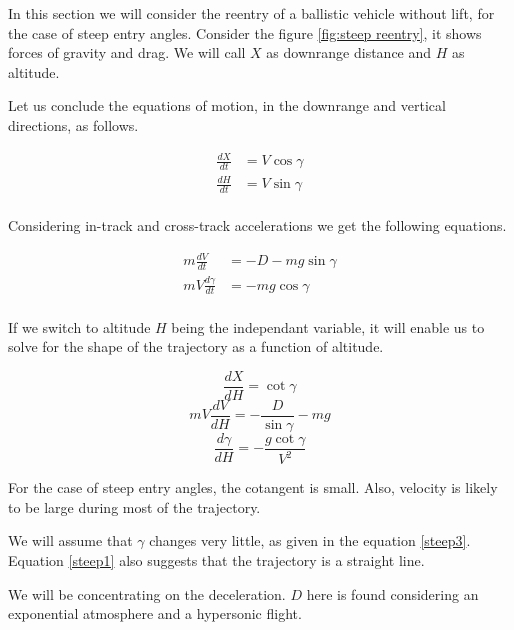 \documentclass{article}
\theoremstyle{definition}
\begin{document}
In this section we will consider the reentry of a ballistic vehicle without lift, for the case of steep entry angles.
Consider the figure \ref{fig:steep reentry}, it shows forces of gravity and drag.
We will call $X$ as downrange distance and $H$ as altitude. 

Let us conclude the equations of motion, in the downrange and vertical directions, as follows.

\begin{equation}
\begin{split}
    \frac{dX}{dt} & = V \cos{\gamma}\\
    \frac{dH}{dt} & = V \sin{\gamma}\\
\end{split}
\end{equation}

Considering in-track and cross-track accelerations we get the following equations.

\begin{equation}
\begin{split}
    m \frac{dV}{dt} & = -D -mg \sin{\gamma} \\
    m V \frac{d\gamma}{dt} & = -mg \cos{\gamma}\\
\end{split}
\end{equation}

If we switch to altitude $H$ being the independant variable, it will enable us to solve for the shape of the trajectory as a function of altitude.

\begin{equation}\label{steep1}
    \frac{dX}{dH} = \cot{\gamma} 
\end{equation}
\begin{equation}\label{steep2}
    m V \frac{dV}{dH} = - \frac{D}{\sin{\gamma}} - mg
\end{equation}
\begin{equation}\label{steep3}
    \frac{d\gamma}{dH}  = -\frac{g \cot{\gamma}}{V^2} 
\end{equation}

For the case of steep entry angles, the cotangent is small.
Also, velocity is likely to be large during most of the trajectory.

We will assume that $\gamma$ changes very little, as given in the equation \ref{steep3}. 
Equation \ref{steep1} also suggests that the trajectory is a straight line.

We will be concentrating on the deceleration.
$D$ here is found considering an exponential atmosphere and a hypersonic flight.
\end{document}
